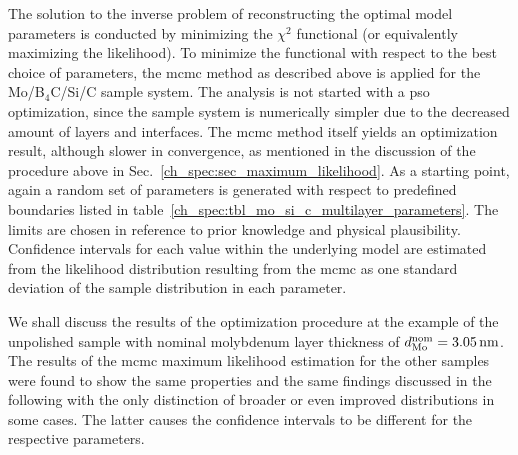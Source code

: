 The solution to the inverse problem of reconstructing the optimal model parameters is conducted by minimizing  the $\chi^2$ functional (or equivalently maximizing the likelihood). To minimize the functional with respect to the best choice of parameters, the \gls{mcmc} method as described above is applied for the Mo/B$_4$C/Si/C sample system. The analysis is not started with a \gls{pso} optimization, since the sample system is numerically simpler due to the decreased amount of layers and interfaces. The \gls{mcmc} method itself yields an optimization result, although slower in convergence, as mentioned in the discussion of the procedure above in Sec.~\ref{ch_spec:sec_maximum_likelihood}. As a starting point, again a random set of parameters is generated with respect to predefined boundaries listed in table~\ref{ch_spec:tbl_mo_si_c_multilayer_parameters}. The limits are chosen in reference to prior knowledge and physical plausibility. Confidence intervals for each value within the underlying model are estimated from the likelihood distribution resulting from the \gls{mcmc} as one standard deviation of the sample distribution in each parameter.

We shall discuss the results of the optimization procedure at the example of the unpolished sample with nominal molybdenum layer thickness of $d_\text{Mo}^\text{nom} = \nm{3.05}$. The results of the \gls{mcmc} maximum likelihood estimation for the other samples were found to show the same properties and the same findings discussed in the following with the only distinction of broader or even improved distributions in some cases. The latter causes the confidence intervals to be different for the respective parameters.

